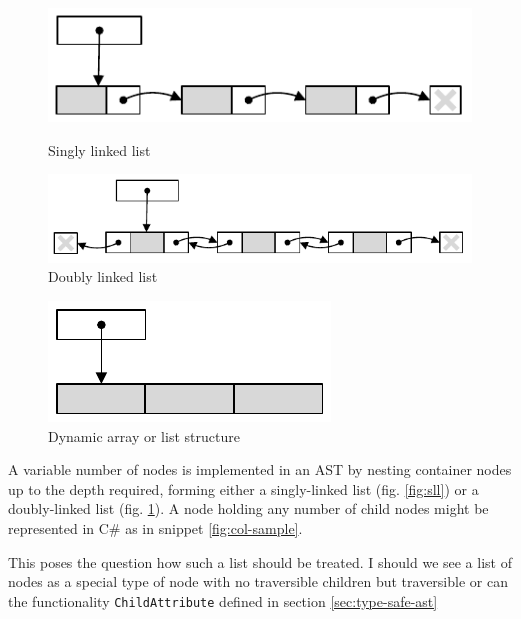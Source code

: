 \documentclass[twoside,openright]{uva-bachelor-thesis}
\newcommand{\includecode}[3]{\begin{figure}\end{figure}}
\newcommand{\code}[1]{\texttt{\footnotesize#1}}
\begin{document}
		\begin{figure}[ht]
			\begin{minipage}[b]{0.45\linewidth}
				\centering
				\includegraphics[width=\textwidth]{figures/collections/sll}
				\caption{Singly linked list}
				\label{fig:sll}
			\end{minipage}
			\hspace{0.5cm}
			\begin{minipage}[b]{0.45\linewidth}
				\centering
				\includegraphics[width=\textwidth]{figures/collections/dll}
				\caption{Doubly linked list}
				\label{fig:dll}
			\end{minipage}
		\end{figure}
		\begin{figure}[h]
			\centering
			\includegraphics{figures/collections/list}
			\caption{Dynamic array or list structure}
			\label{fig:list}
		\end{figure}
		
		A variable number of nodes is implemented in an AST by nesting container nodes up to the depth required, forming either a singly-linked list (fig. \ref{fig:sll}) or a doubly-linked list (fig. \ref{fig:dll}). A node holding any number of child nodes might be represented in C\# as in snippet \ref{fig:col-sample}.

		\includecode{lists_as_attribs.cs}{col-sample}{Example of lists as traversible attributes}		
	
		This poses the question how such a list should be treated. I should we see a list of nodes as a special type of node with no traversible children but traversible or can the functionality  \code{ChildAttribute} defined in section \ref{sec:type-safe-ast} 
		
\end{document}
